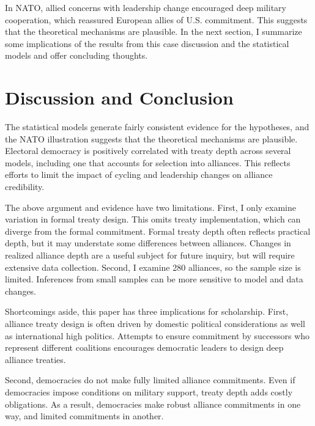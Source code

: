 \documentclass[12pt]{article}
\begin{document}


In NATO, allied concerns with leadership change encouraged deep military cooperation, which reassured European allies of U.S. commitment. 
This suggests that the theoretical mechanisms are plausible. 
In the next section, I summarize some implications of the results from this case discussion and the statistical models and offer concluding thoughts. 



\section{Discussion and Conclusion} 


The statistical models generate fairly consistent evidence for the hypotheses, and the NATO illustration suggests that the theoretical mechanisms are plausible. 
Electoral democracy is positively correlated with treaty depth across several models, including one that accounts for selection into alliances. 
This reflects efforts to limit the impact of cycling and leadership changes on alliance credibility. 


The above argument and evidence have two limitations.
First, I only examine variation in formal treaty design. 
This omits treaty implementation, which can diverge from the formal commitment.   
Formal treaty depth often reflects practical depth, but it may understate some differences between alliances. 
Changes in realized alliance depth are a useful subject for future inquiry, but will require extensive data collection.
Second, I examine 280 alliances, so the sample size is limited. 
Inferences from small samples can be more sensitive to model and data changes. 


Shortcomings aside, this paper has three implications for scholarship. 
First, alliance treaty design is often driven by domestic political considerations as well as international high politics. 
Attempts to ensure commitment by successors who represent different coalitions encourages democratic leaders to design deep alliance treaties. 

Second, democracies do not make fully limited alliance commitments.
Even if democracies impose conditions on military support, treaty depth adds costly obligations.
As a result, democracies make robust alliance commitments in one way, and limited commitments in another. 
\end{document}
